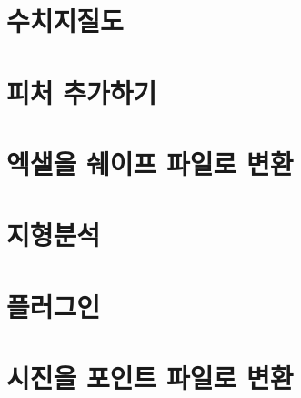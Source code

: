 \documentclass[12pt, a3paper, landscape, oneside]{book}
\let\stdsection\section
\renewcommand\section{\newpage\stdsection}
\begin{document}
	\section{수치지질도}
	\pagestyle{empty}


	\section{피처 추가하기}
	\pagestyle{empty}


	\section{엑샐을 쉐이프 파일로 변환}
	\pagestyle{empty}


	\section{지형분석}
	\pagestyle{empty}


	\section{플러그인}
	\pagestyle{empty}


	\section{시진을 포인트 파일로 변환}
	\pagestyle{empty}








\end{document}
